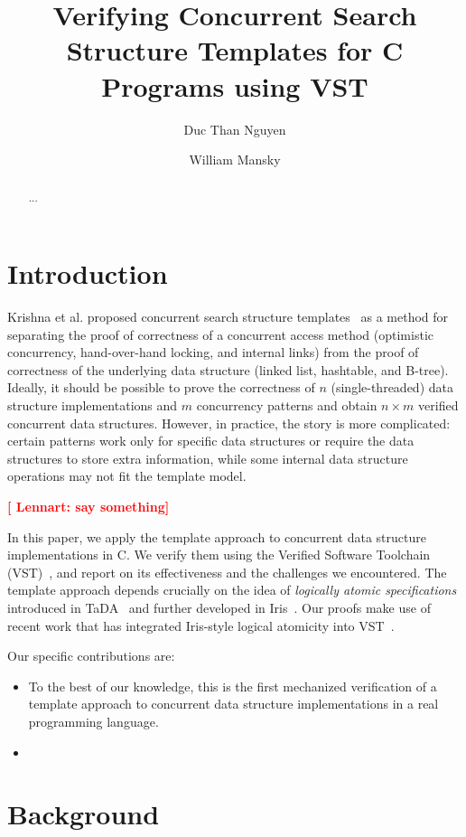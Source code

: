 \documentclass[a4paper,UKenglish,cleveref, autoref, thm-restate]{lipics-v2021}
\title{Verifying Concurrent Search Structure Templates for C Programs using VST} %
\author{Duc Than Nguyen}{University of Illinois at Chicago, USA \and \url{http://www.myhomepage.edu} }{johnqpublic@dummyuni.org}{https://orcid.org/0000-0002-1825-0097}{(Optional) author-specific funding acknowledgements}%
\author{William Mansky}{University of Illinois at Chicago, USA}{joanrpublic@dummycollege.org}{[orcid]}{[funding]}
\newcommand{\lb}[1]{\textbf{\textcolor{red}{[ Lennart: #1]}}}
\begin{document}
\maketitle

\begin{abstract}
... 
\end{abstract}

\section{Introduction}
\label{sec:introduction}
Krishna et al. proposed concurrent search structure templates~\cite{templates} as a method for separating the proof of correctness of a concurrent access method (optimistic concurrency, hand-over-hand locking, and internal links) from the proof of correctness of the underlying data structure (linked list, hashtable, and B-tree). Ideally, it should be possible to prove the correctness of $n$ (single-threaded) data structure implementations and $m$ concurrency patterns and obtain $n \times m$ verified concurrent data structures. However, in practice, the story is more complicated: certain patterns work only for specific data structures or require the data structures to store extra information, while some internal data structure operations may not fit the template model. 

\lb{say something} 

In this paper, we apply the template approach to concurrent data structure implementations in C. We verify them using the Verified Software Toolchain (VST)~\cite{plfcc}, and report on its effectiveness and the challenges we encountered. The template approach depends crucially on the idea of \emph{logically atomic specifications} introduced in TaDA~\cite{tada} and further developed in Iris~\cite{iris}. Our proofs make use of recent work that has integrated Iris-style logical atomicity into VST~\cite{iris-vst-arxiv}.

Our specific contributions are:
\begin{itemize}
\item To the best of our knowledge, this is the first mechanized verification of a template approach to concurrent data structure implementations in a real programming language.
\item 
\end{itemize}


\section{Background}
\end{document}
